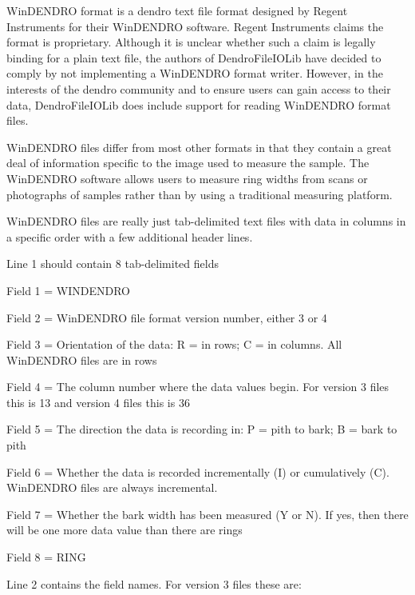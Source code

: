 \documentclass[10pt, headsepline,DIV14,BCOR0.5cm]{scrreprt}
\begin{document}
WinDENDRO format is a dendro text file format designed by Regent Instruments for their WinDENDRO software. Regent Instruments claims the format is proprietary. Although it is unclear whether such a claim is legally binding for a plain text file, the authors of DendroFileIOLib have decided to comply by not implementing a WinDENDRO format writer. However, in the interests of the dendro community and to ensure users can gain access to their data, DendroFileIOLib does include support for reading WinDENDRO format files.

WinDENDRO files differ from most other formats in that they contain a great deal of information specific to the image used to measure the sample. The WinDENDRO software allows users to measure ring widths from scans or photographs of samples rather than by using a traditional measuring platform.

WinDENDRO files are really just tab-delimited text files with data in columns in a specific order with a few additional header lines.

Line 1 should contain 8 tab-delimited fields 

\begin{itemize*}
 \item Field 1 = WINDENDRO
 \item  Field 2 = WinDENDRO file format version number, either 3 or 4
 \item  Field 3 = Orientation of the data: R = in rows; C = in columns. All WinDENDRO files are in rows
 \item  Field 4 = The column number where the data values begin. For version 3 files this is 13 and version 4 files this is 36
 \item  Field 5 = The direction the data is recording in: P = pith to bark; B = bark to pith
 \item  Field 6 = Whether the data is recorded incrementally (I) or cumulatively (C). WinDENDRO files are always incremental.
 \item  Field 7 = Whether the bark width has been measured (Y or N). If yes, then there will be one more data value than there are rings
 \item  Field 8 = RING 
\end{itemize*}

Line 2 contains the field names.  For version 3 files these are:
\end{document}

